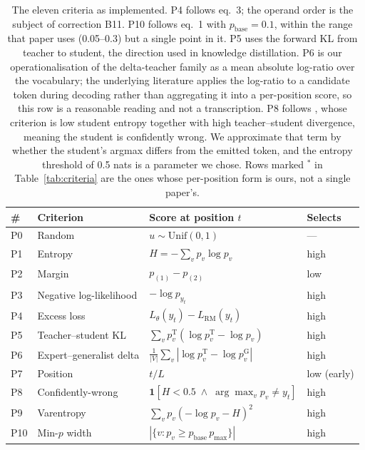 \begin{table}[H]
\centering\small
\begin{tabular}{llll}
\toprule
\# & Criterion & Score at position $t$ & Selects \\
\midrule
P0 & Random & $u \sim \mathrm{Unif}(0,1)$ & --- \\
P1 & Entropy & $H = -\sum_v p_v \log p_v$ & high \\
P2 & Margin & $p_{(1)} - p_{(2)}$ & low \\
P3 & Negative log-likelihood & $-\log p_{y_t}$ & high \\
P4 & Excess loss & $L_\theta(y_t) - L_{\mathrm{RM}}(y_t)$ & high \\
P5 & Teacher--student KL & $\sum_v p^{\mathrm{T}}_v (\log p^{\mathrm{T}}_v - \log p_v)$ & high \\
P6 & Expert--generalist delta & $\frac{1}{|V|}\sum_v \left| \log p^{\mathrm{T}}_v - \log p^{\mathrm{G}}_v \right|$ & high \\
P7 & Position & $t / L$ & low (early) \\
P8 & Confidently-wrong & $\mathbf{1}[H < 0.5 \;\wedge\; \arg\max_v p_v \neq y_t]$ & high \\
P9 & Varentropy & $\sum_v p_v (-\log p_v - H)^2$ & high \\
P10 & Min-$p$ width & $\left| \{ v : p_v \geq p_{\mathrm{base}}\, p_{\max} \} \right|$ & high \\
\bottomrule
\end{tabular}
\caption{The eleven criteria as implemented. P4 follows \citet{lin2024rho} eq.\ 3; the operand order
is the subject of correction B11. P10 follows \citet{nguyen2024minp} eq.\ 1 with
$p_{\mathrm{base}} = 0.1$, within the range that paper uses (0.05--0.3) but a single point in it.
P5 uses the forward KL from teacher to student, the direction used in knowledge distillation. P6 is
our operationalisation of the delta-teacher family as a mean absolute log-ratio over the vocabulary;
the underlying literature applies the log-ratio to a candidate token during decoding rather than
aggregating it into a per-position score, so this row is a reasonable reading and not a
transcription. P8 follows \citet{xu2026tip}, whose criterion is low student entropy together with high
teacher--student divergence, meaning the student is confidently wrong. We approximate that term by
whether the student's argmax differs from the emitted token, and the entropy threshold of 0.5 nats
is a parameter we chose. Rows marked $^\ast$ in Table~\ref{tab:criteria} are the ones whose
per-position form is ours, not a single paper's.}
\label{tab:critdefs}
\end{table}

